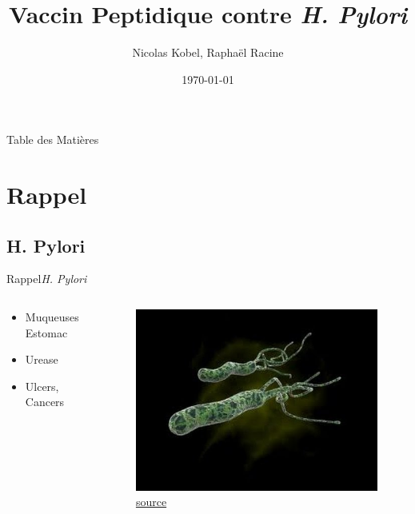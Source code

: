 \documentclass{PresentationHEIGVD}
\institute{}
\title{Vaccin Peptidique contre \textit{H. Pylori}}
\author{Nicolas Kobel, Raphaël Racine}
\date{\today}
\begin{document}

\begin{frame}{Table des Matières}
\tableofcontents
\end{frame}

\section{Rappel}
\subsection{H. Pylori}
\begin{frame}{Rappel}{\textit{H. Pylori}}
\begin{columns}[c]
	\begin{column}[c]{5cm}
		\begin{itemize}[<+->]
			\item Muqueuses Estomac
			\item Urease
			\item Ulcers, Cancers
		\end{itemize}
	\end{column}
	\begin{column}[c]{5cm}
	\begin{figure}
		\includegraphics[width=\textwidth]{img/hpylori.jpg}
		\caption{\href{https://i.ytimg.com/vi/DYzYLTRASRM/hqdefault.jpg}{source}}
	\end{figure}
	
	\end{column}
\end{columns}
\end{frame}
\end{document}
